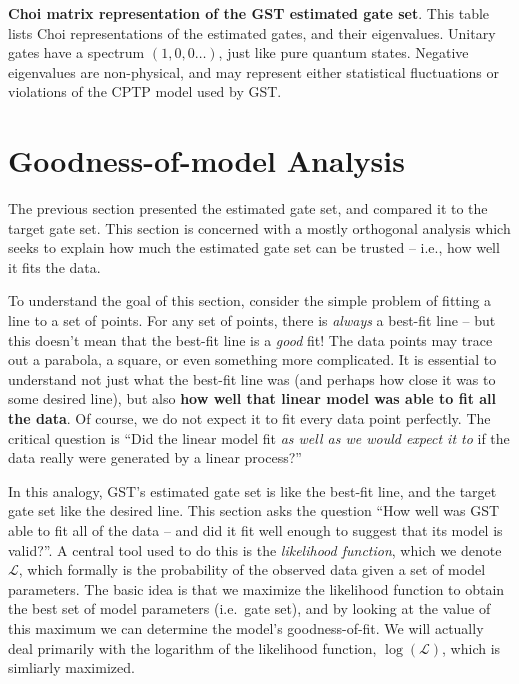 \documentclass{article}[11pt]
\begin{document}
\begin{table}[h]
\begin{center}
\caption{\textbf{Choi matrix representation of the GST estimated gate set}.  This table lists Choi representations of the estimated gates, and their eigenvalues.  Unitary gates have a spectrum $(1,0,0\ldots)$, just like pure quantum states.  Negative eigenvalues are non-physical, and may represent either statistical fluctuations or violations of the CPTP model used by GST.\label{bestGatesetChoiTable}}
\end{center}
\end{table}



\section{Goodness-of-model Analysis\label{secGoodness}}

The previous section presented the estimated gate set, and compared it to the target gate set.  This section is concerned with a mostly orthogonal analysis which seeks to explain how much the estimated gate set can be trusted -- i.e., how well it fits the data.

To understand the goal of this section, consider the simple problem of fitting a line to a set of points.  For any set of points, there is \emph{always} a best-fit line -- but this doesn't mean that the best-fit line is a \emph{good} fit!  The data points may trace out a parabola, a square, or even something more complicated.  It is essential to understand not just what the best-fit line was (and perhaps how close it was to some desired line), but also \textbf{how well that linear model was able to fit all the data}.  Of course, we do not expect it to fit every data point perfectly.  The critical question is ``Did the linear model fit \emph{as well as we would expect it to} if the data really were generated by a linear process?''

In this analogy, GST's estimated gate set is like the best-fit line, and the target gate set like the desired line.  This section asks the question ``How well was GST able to fit all of the data -- and did it fit well enough to suggest that its model is valid?''. A central tool used to do this is the \emph{likelihood function}, which we denote $\mathcal{L}$, which formally is the probability of the observed data given a set of model parameters.  The basic idea is that we maximize the likelihood function to obtain the best set of model parameters (i.e.~gate set), and by looking at the value of this maximum we can determine the model's goodness-of-fit.  We will actually deal primarily with the logarithm of the likelihood function, $\log(\mathcal{L})$, which is simliarly maximized.
\end{document}
